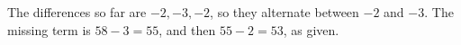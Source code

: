 The differences so far are $-2,-3,-2$, so they alternate between $-2$ and $-3$. The missing term is $58-3=\boxed{55}$, and then $55-2=53$, as given.
